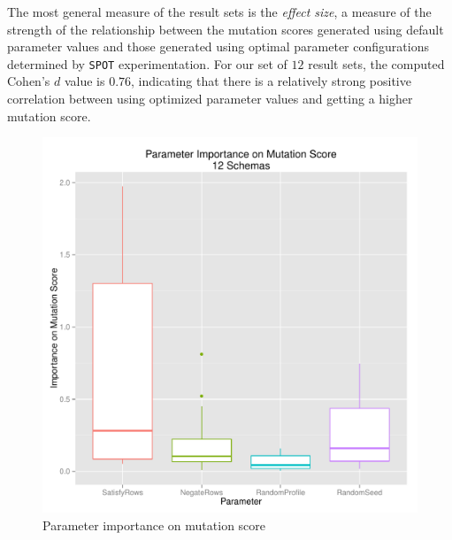 \documentclass[a4paper,twocolumn]{article}
\begin{document}
The most general measure of the result sets is the \textit{effect size}, a measure of the strength of the relationship between the mutation scores generated using default parameter values and those generated using optimal parameter configurations determined by \texttt{SPOT} experimentation. For our set of $12$ result sets, the computed Cohen's $d$ value is $0.76$, indicating that there is a relatively strong positive correlation between using optimized parameter values and getting a higher mutation score.

\begin{figure}[t]
\begin{center}
\includegraphics[width=0.90\columnwidth]{mutation-score-importance.pdf}
\caption{Parameter importance on mutation score}
\end{center}
\label{fig:mut-param-imp}
\end{figure}
\end{document}
